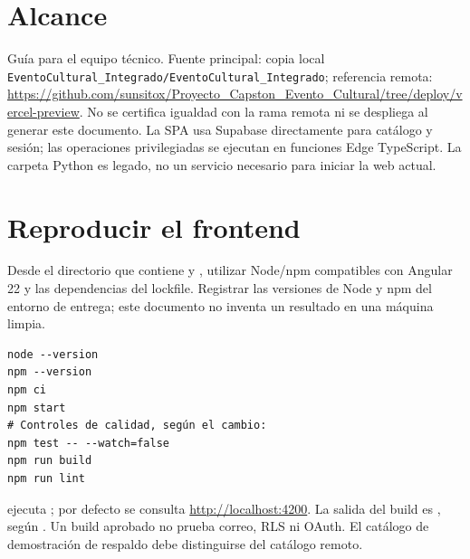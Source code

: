 \documentclass[11pt,a4paper]{article}
\begin{document}
\maketitlecapstone
\section{Alcance}
Guía para el equipo técnico. Fuente principal: copia local
\nolinkurl{EventoCultural_Integrado/EventoCultural_Integrado}; referencia remota:
\url{https://github.com/sunsitox/Proyecto_Capston_Evento_Cultural/tree/deploy/vercel-preview}.
No se certifica igualdad con la rama remota ni se despliega al generar este documento.
La SPA usa Supabase directamente para catálogo y sesión; las operaciones privilegiadas
se ejecutan en funciones Edge TypeScript. La carpeta Python  es legado,
no un servicio necesario para iniciar la web actual.

\section{Reproducir el frontend}
Desde el directorio que contiene  y ,
utilizar Node/npm compatibles con Angular 22 y las dependencias del lockfile.
Registrar las versiones de Node y npm del entorno de entrega; este documento no
inventa un resultado en una máquina limpia.
\begin{verbatim}
node --version
npm --version
npm ci
npm start
# Controles de calidad, según el cambio:
npm test -- --watch=false
npm run build
npm run lint
\end{verbatim}
 ejecuta ; por defecto se consulta
\url{http://localhost:4200}. La salida del build es , según
. Un build aprobado no prueba correo, RLS ni OAuth.
El catálogo de demostración de respaldo debe distinguirse del catálogo remoto.
\end{document}
